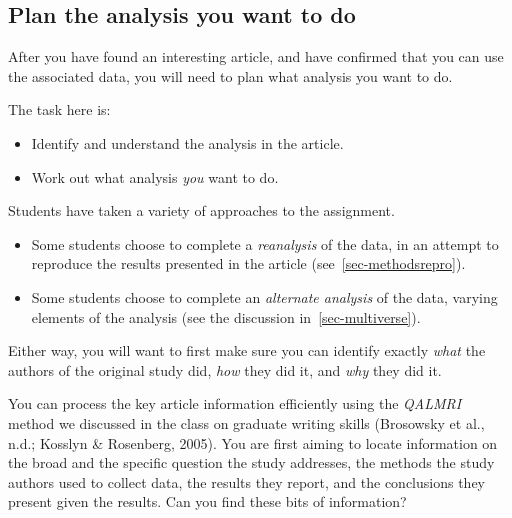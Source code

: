 \documentclass[
  letterpaper,
  DIV=11,
  numbers=noendperiod]{scrreprt}
\providecommand{\tightlist}{%
  \setlength{\itemsep}{0pt}\setlength{\parskip}{0pt}}\usepackage{longtable,booktabs,array}
\begin{document}
\hypertarget{sec-whatanalysis}{%
\subsection{Plan the analysis you want to do}\label{sec-whatanalysis}}

After you have found an interesting article, and have confirmed that you
can use the associated data, you will need to plan what analysis you
want to do.

\begin{tcolorbox}[enhanced jigsaw, opacitybacktitle=0.6, title=\textcolor{quarto-callout-tip-color}{\faLightbulb}\hspace{0.5em}{Tip}, arc=.35mm, colbacktitle=quarto-callout-tip-color!10!white, colframe=quarto-callout-tip-color-frame, leftrule=.75mm, opacityback=0, breakable, titlerule=0mm, left=2mm, bottomrule=.15mm, toprule=.15mm, colback=white, coltitle=black, bottomtitle=1mm, toptitle=1mm, rightrule=.15mm]

The task here is:

\begin{itemize}
\tightlist
\item
  Identify and understand the analysis in the article.
\item
  Work out what analysis \emph{you} want to do.
\end{itemize}

\end{tcolorbox}

Students have taken a variety of approaches to the assignment.

\begin{itemize}
\tightlist
\item
  Some students choose to complete a \emph{reanalysis} of the data, in
  an attempt to reproduce the results presented in the article
  (see~\ref{sec-methodsrepro}).
\item
  Some students choose to complete an \emph{alternate analysis} of the
  data, varying elements of the analysis (see the discussion
  in~\ref{sec-multiverse}).
\end{itemize}

Either way, you will want to first make sure you can identify exactly
\emph{what} the authors of the original study did, \emph{how} they did
it, and \emph{why} they did it.

You can process the key article information efficiently using the
\emph{QALMRI} method we discussed in the class on graduate writing
skills (Brosowsky et al., n.d.; Kosslyn \& Rosenberg, 2005). You are
first aiming to locate information on the broad and the specific
question the study addresses, the methods the study authors used to
collect data, the results they report, and the conclusions they present
given the results. Can you find these bits of information?
\end{document}
